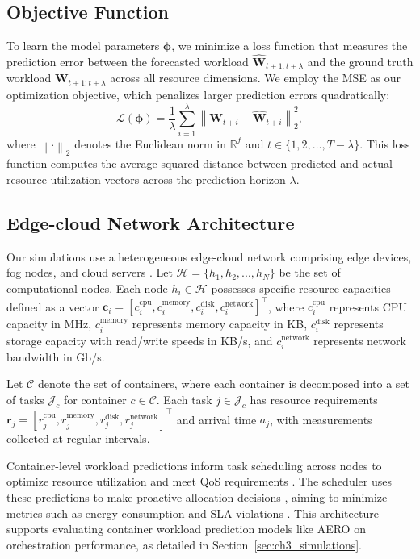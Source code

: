 \subsection{Objective Function}

To learn the model parameters $\boldsymbol{\phi}$, we minimize a loss function that measures the prediction error between the forecasted workload $\hat{\mathbf{W}}_{t+1:t+\lambda}$ and the ground truth workload $\mathbf{W}_{t+1:t+\lambda}$ across all resource dimensions. We employ the \ac{MSE} as our optimization objective, which penalizes larger prediction errors quadratically: 
\begin{equation}
\mathcal{L}(\boldsymbol{\phi}) = \frac{1}{\lambda} \sum_{i=1}^{\lambda} \left\| \mathbf{W}_{t+i} - \hat{\mathbf{W}}_{t+i} \right\|_2^2,
\end{equation}
where $\left\| \cdot \right\|_2$ denotes the Euclidean norm in $\mathbb{R}^f$ and $t \in \{1, 2, \ldots, T-\lambda\}$. This loss function computes the average squared distance between predicted and actual resource utilization vectors across the prediction horizon $\lambda$.

\subsection{Edge-cloud Network Architecture}

Our simulations use a heterogeneous edge-cloud network comprising edge devices, fog nodes, and cloud servers \cite{tuli2021cosco}. Let $\mathcal{H} = \{h_1, h_2, ..., h_N\}$ be the set of computational nodes. Each node $h_i \in \mathcal{H}$ possesses specific resource capacities defined as a vector $\mathbf{c}_i = [c_i^{\text{cpu}}, c_i^{\text{memory}}, c_i^{\text{disk}}, c_i^{\text{network}}]^\top$, where $c_i^{\text{cpu}}$ represents \ac{CPU} capacity in \ac{MHz}, $c_i^{\text{memory}}$ represents memory capacity in KB, $c_i^{\text{disk}}$ represents storage capacity with read/write speeds in KB/s, and $c_i^{\text{network}}$ represents network bandwidth in Gb/s.

Let $\mathcal{C}$ denote the set of containers, where each container is decomposed into a set of tasks $\mathcal{J}_c$ for container $c \in \mathcal{C}$. Each task $j \in \mathcal{J}_c$ has resource requirements $\mathbf{r}_j = [r_j^{\text{cpu}}, r_j^{\text{memory}}, r_j^{\text{disk}}, r_j^{\text{network}}]^\top$ and arrival time $a_j$, with measurements collected at regular intervals.

Container-level workload predictions inform task scheduling across nodes to optimize resource utilization and meet \ac{QoS} requirements \cite{tuli2021cosco}. The scheduler uses these predictions to make proactive allocation decisions \cite{farhad2023ai}, aiming to minimize metrics such as energy consumption and \ac{SLA} violations \cite{raith2024opportunistic}. This architecture supports evaluating container workload prediction models like \ac{AERO} on orchestration performance, as detailed in Section~\ref{sec:ch3_simulations}.
